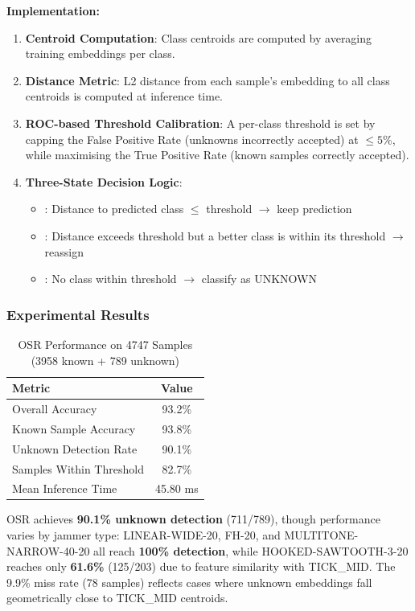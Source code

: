 \textbf{Implementation:}
\begin{enumerate}
    \item \textbf{Centroid Computation}: Class centroids are computed by averaging training embeddings per class.
    \item \textbf{Distance Metric}: L2 distance from each sample's embedding to all class centroids is computed at inference time.
    \item \textbf{ROC-based Threshold Calibration}: A per-class threshold is set by capping the False Positive Rate (unknowns incorrectly accepted) at $\leq 5\%$, while maximising the True Positive Rate (known samples correctly accepted).
    \item \textbf{Three-State Decision Logic}:
    \begin{itemize}
        \item[\textbf{ACCEPT}]: Distance to predicted class $\leq$ threshold $\rightarrow$ keep prediction
        \item[\textbf{CORRECT}]: Distance exceeds threshold but a better class is within its threshold $\rightarrow$ reassign
        \item[\textbf{REJECT}]: No class within threshold $\rightarrow$ classify as UNKNOWN
    \end{itemize}
\end{enumerate}

\subsubsection{Experimental Results}

\begin{table}[h]
\centering
\begin{tabular}{|l|c|}
\hline
\textbf{Metric} & \textbf{Value} \\
\hline
Overall Accuracy & 93.2\% \\
Known Sample Accuracy & 93.8\% \\
Unknown Detection Rate & 90.1\% \\
Samples Within Threshold & 82.7\% \\
Mean Inference Time & 45.80 ms \\
\hline
\end{tabular}
\caption{OSR Performance on 4747 Samples (3958 known + 789 unknown)}
\end{table}

OSR achieves \textbf{90.1\% unknown detection} (711/789), though performance varies by jammer type: LINEAR-WIDE-20, FH-20, and MULTITONE-NARROW-40-20 all reach \textbf{100\% detection}, while HOOKED-SAWTOOTH-3-20 reaches only \textbf{61.6\%} (125/203) due to feature similarity with TICK\_MID. The 9.9\% miss rate (78 samples) reflects cases where unknown embeddings fall geometrically close to TICK\_MID centroids.


